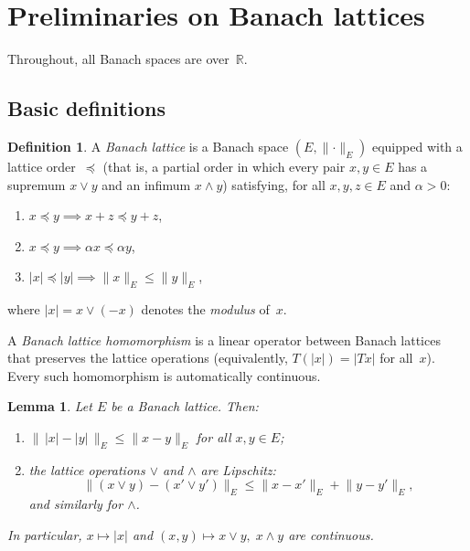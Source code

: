 \documentclass[12pt]{amsart}
\renewcommand{\le}{\leqslant}
\theoremstyle{plain}
\newtheorem{lemma}[theorem]{Lemma}
\theoremstyle{definition}
\newtheorem{definition}[theorem]{Definition}
\theoremstyle{remark}
\newcommand{\R}{\mathbb{R}}
\begin{document}
\section{Preliminaries on Banach lattices}\label{sec:prelim-lattice}

Throughout, all Banach spaces are over~$\R$.

\subsection{Basic definitions}

\begin{definition}
A \emph{Banach lattice} is a Banach space $(E, \lVert\cdot\rVert_E)$ equipped
with a lattice order~$\preceq$ (that is, a partial order in which every pair
$x, y \in E$ has a supremum $x \vee y$ and an infimum $x \wedge y$) satisfying,
for all $x, y, z \in E$ and $\alpha > 0$:
\begin{enumerate}[label=(\roman*)]
    \item $x \preceq y \implies x + z \preceq y + z$,
    \item $x \preceq y \implies \alpha x \preceq \alpha y$,
    \item $\lvert x \rvert \preceq \lvert y \rvert \implies
      \lVert x \rVert_E \le \lVert y \rVert_E$,
\end{enumerate}
where $\lvert x \rvert = x \vee (-x)$ denotes the \emph{modulus} of~$x$.
\end{definition}

A \emph{Banach lattice homomorphism} is a linear operator between Banach lattices
that preserves the lattice operations (equivalently, $T(\lvert x \rvert)
= \lvert Tx \rvert$ for all~$x$).  Every such homomorphism is automatically
continuous.

\begin{lemma}\label{lem:lattice-ops-lipschitz}
Let $E$ be a Banach lattice.  Then:
\begin{enumerate}[label=\textup{(\roman*)}]
    \item $\bigl\lVert\,\lvert x \rvert - \lvert y \rvert\,\bigr\rVert_E
      \le \lVert x - y \rVert_E$ for all $x, y \in E$;
    \item the lattice operations $\vee$ and $\wedge$ are Lipschitz:
      \[
          \lVert (x \vee y) - (x' \vee y') \rVert_E
          \le \lVert x - x' \rVert_E + \lVert y - y' \rVert_E,
      \]
      and similarly for $\wedge$.
\end{enumerate}
In particular, $x \mapsto \lvert x \rvert$ and
$(x,y) \mapsto x \vee y,\; x \wedge y$ are continuous.
\end{lemma}
\end{document}

